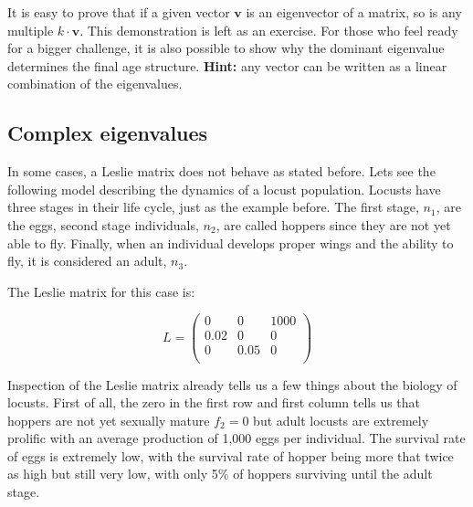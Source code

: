 \documentclass{tufte-book} %
\begin{document}
It is easy to prove that if a given vector $\mathbf{v}$ is an eigenvector of a matrix, so is any multiple $k \cdot\mathbf{v}$. This demonstration is left as an exercise. For those who feel ready for a bigger challenge, it is also possible to show why the dominant eigenvalue determines the final age structure. \textbf{Hint:} any vector can be written as a linear combination of the eigenvalues.

\subsection{Complex eigenvalues}

In some cases, a Leslie matrix does not behave as stated before. Lets see the following model describing the dynamics of a locust population. Locusts have three stages in their life cycle, just as the example before. The first stage, $n_1$, are the eggs, second stage individuals, $n_2$, are called hoppers since they are not yet able to fly. Finally, when an individual develops proper wings and the ability to fly, it is considered an adult, $n_3$.

The Leslie matrix for this case is:

\begin{equation}
L=\begin{pmatrix}
	0	&0	&1000	\\
	0.02	&0	&0	\\
	0	&0.05	&0	\\
\end{pmatrix}
\end{equation}

Inspection of the Leslie matrix already tells us a few things about the biology of locusts. First of all, the zero in the first row and first column tells us that hoppers are not yet sexually mature $f_2=0$ but adult locusts are extremely prolific with an average production of 1,000 eggs per individual. The survival rate of eggs is extremely low, with the survival rate of hopper being more that twice as high but still very low, with only 5\% of hoppers surviving until the adult stage.
\end{document}

